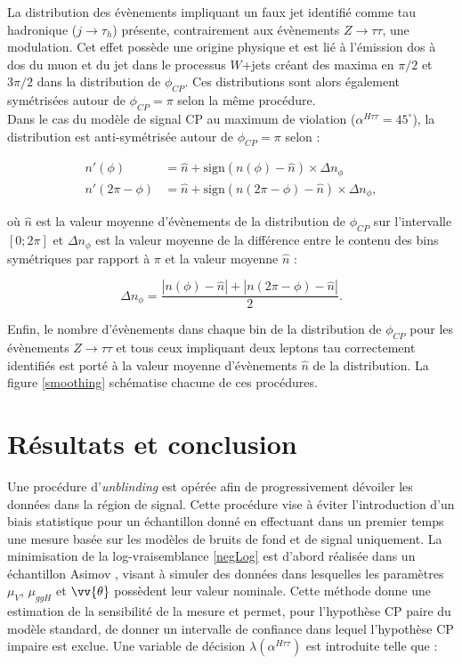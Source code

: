La distribution des évènements impliquant un faux jet identifié comme tau hadronique ($j\to\tau_h$) présente, contrairement aux évènements $Z\to\tau\tau$, une modulation. Cet effet possède une origine physique et est lié à l'émission dos à dos du muon et du jet dans le processus $W$+jets créant des maxima en $\pi/2$ et $3\pi/2$ dans la distribution de $\phi_{CP}$. Ces distributions sont alors également symétrisées autour de $\phi_{CP}=\pi$ selon la même procédure. \\

Dans le cas du modèle de signal CP au maximum de violation ($\alpha^{H\tau\tau}=45^\circ$), la distribution est anti-symétrisée autour de $\phi_{CP}=\pi$ selon :

\begin{align}
    n'(\phi)&=\hat{n}+\text{sign}(n(\phi)-\hat{n})\times\Delta n_{\phi} \\
    n'(2\pi-\phi)&=\hat{n}+\text{sign}(n(2\pi-\phi)-\hat{n})\times\Delta n_{\phi},
\end{align}

où $\hat{n}$ est la valeur moyenne d'évènements de la distribution de $\phi_{CP}$ sur l'intervalle $\left[0;2\pi\right]$ et $\Delta n_{\phi}$ est la valeur moyenne de la différence entre le contenu des bins symétriques par rapport à $\pi$ et la valeur moyenne $\hat{n}$ :

\begin{equation}
    \Delta n_{\phi} = \frac{|n(\phi)-\hat{n}|+|n(2\pi-\phi)-\hat{n}|}{2}.
\end{equation}

Enfin, le nombre d'évènements dans chaque bin de la distribution de $\phi_{CP}$ pour les évènements $Z\to\tau\tau$ et tous ceux impliquant deux leptons tau correctement identifiés est porté à la valeur moyenne d'évènements $\hat{n}$ de la distribution. La figure \ref{smoothing} schématise chacune de ces procédures.

\section{Résultats et conclusion}

Une procédure d'\textit{unblinding} est opérée afin de progressivement dévoiler les données dans la région de signal. Cette procédure vise à éviter l'introduction d'un biais statistique pour un échantillon donné en effectuant dans un premier temps une mesure basée sur les modèles de bruits de fond et de signal uniquement. La minimisation de la log-vraisemblance \ref{negLog} est d'abord réalisée dans un échantillon Asimov \cite{Cowan2011}, visant à simuler des données dans lesquelles les paramètres $\mu_V$, $\mu_{ggH}$ et $\vv{\theta}$ possèdent leur valeur nominale. Cette méthode donne une estimation de la sensibilité de la mesure et permet, pour l'hypothèse CP paire du modèle standard, de donner un intervalle de confiance dans lequel l'hypothèse CP impaire est exclue. Une variable de décision $\lambda(\alpha^{H\tau\tau})$ est introduite telle que :

